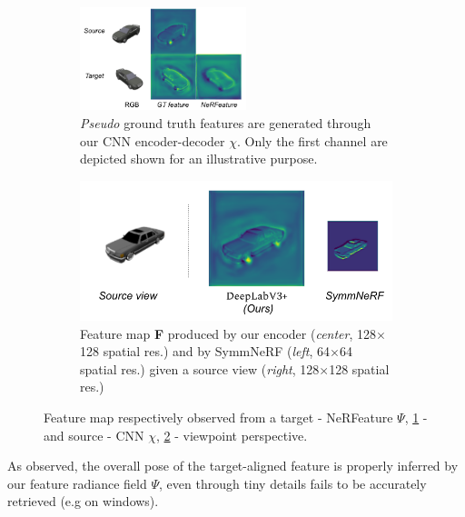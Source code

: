 \begin{figure}[htb!]
  \centering
  \begin{subfigure}[t]{0.45\linewidth}
    \includegraphics[height=3cm]{images/epinerf/nerfeature.png}
    \caption{\textit{Pseudo} ground truth features are generated through our CNN encoder-decoder $\chi$. Only the first channel are depicted shown for an illustrative purpose.}
    \label{fig:nerfeature_prediction}
  \end{subfigure}
  \hfill
  \begin{subfigure}[t]{0.51\linewidth}
    \includegraphics[height=3.cm]{images/epinerf/feature_visuals.png}
    \caption{Feature map \textbf{F} produced by our encoder (\textit{center}, 128$\times$128 spatial res.) and by SymmNeRF (\textit{left}, 64$\times$64 spatial res.) given a source view (\textit{right}, 128$\times$128 spatial res.)}
    \label{fig:featuremap_comparison}
  \end{subfigure}
  \caption{Feature map respectively observed from a target - NeRFeature $\Psi$, \ref{fig:nerfeature_prediction} - and source - CNN $\chi$, \ref{fig:featuremap_comparison} - viewpoint perspective. }
  \label{fig:short}
\end{figure}

As observed, the overall pose of the target-aligned feature is properly inferred by our feature radiance field $\Psi$, even through tiny details fails to be accurately retrieved (e.g on windows). 

